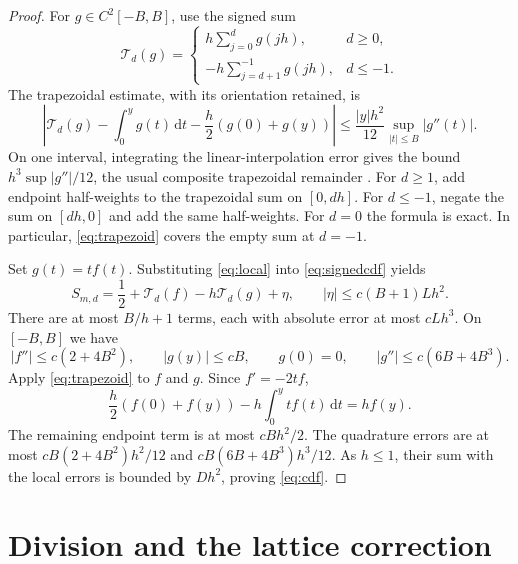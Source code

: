 \documentclass[11pt]{amsart}
\newcommand{\dd}{\,\mathrm d}
\begin{document}
\begin{proof}
For $g\in C^2[-B,B]$, use the signed sum
\[
 \mathcal T_d(g)=
 \begin{cases}
 \displaystyle h\sum_{j=0}^d g(jh),&d\ge0,\\[3pt]
 \displaystyle-h\sum_{j=d+1}^{-1}g(jh),&d\le-1.
 \end{cases}
\]
The trapezoidal estimate, with its orientation retained, is
\begin{equation}\label{eq:trapezoid}
 \left|\mathcal T_d(g)-\int_0^y g(t)\dd t
             -\frac h2(g(0)+g(y))\right|
 \le\frac{|y|h^2}{12}\sup_{|t|\le B}|g''(t)|.
\end{equation}
On one interval, integrating the linear-interpolation error gives
the bound $h^3\sup|g''|/12$, the usual composite trapezoidal remainder
\cite[Eqs.~3.5.2--3.5.3]{DLMF}.
For $d\ge1$, add endpoint half-weights to the trapezoidal sum on
$[0,dh]$. For $d\le-1$, negate the sum on $[dh,0]$ and add the same
half-weights. For $d=0$ the formula is exact. In particular,
\eqref{eq:trapezoid} covers the empty sum at $d=-1$.

Set $g(t)=tf(t)$. Substituting \eqref{eq:local} into
\eqref{eq:signedcdf} yields
\[
 S_{m,d}=\frac12+\mathcal T_d(f)-h\mathcal T_d(g)+\eta,
 \qquad |\eta|\le c(B+1)Lh^2.
\]
There are at most $B/h+1$ terms, each with absolute error at most
$cLh^3$. On $[-B,B]$ we have
\[
 |f''|\le c(2+4B^2),\qquad |g(y)|\le cB,\qquad
 g(0)=0,\qquad |g''|\le c(6B+4B^3).
\]
Apply \eqref{eq:trapezoid} to $f$ and $g$. Since $f'=-2tf$,
\[
 \frac h2(f(0)+f(y))-h\int_0^y tf(t)\dd t=hf(y).
\]
The remaining endpoint term is at most $cBh^2/2$. The quadrature
errors are at most $cB(2+4B^2)h^2/12$ and
$cB(6B+4B^3)h^3/12$. As $h\le1$, their sum with the local errors
is bounded by $Dh^2$, proving \eqref{eq:cdf}.
\end{proof}

\section{Division and the lattice correction}
\end{document}
